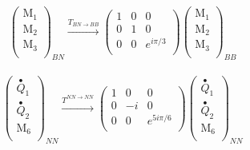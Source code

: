 \documentclass[12pt,a4paper]{article}
\newcounter{arrow}
\begin{document}
\begin{align}
\left( \begin{matrix}
\text{M}_1\\
\text{M}_2\\
\text{M}_3\\
\end{matrix} \right)_{BN} 
\xrightarrow{T_{BN \rightarrow BB}} 
\left(\begin{matrix} 
1 & 0 &0 \\
0 & 1 & 0 \\
0 & 0 & e^{i \pi /3} \\
\end{matrix} \right)
\left( \begin{matrix}
\text{M}_1\\
\text{M}_2\\
\text{M}_3\\
\end{matrix} \right)_{BB}
\end{align}

\begin{align}
\left( \begin{matrix}
\stackrel{\bullet}{Q}_{1}\\
\stackrel{\bullet}{Q}_{2}\\
\text{M}_6 \\ 
\end{matrix} \right)_{NN} \xrightarrow{T^{NN\rightarrow NN}}
\left( \begin{matrix} 
1 & 0&0 \\
0 & -i & 0 \\
0 & 0& e^{5 i \pi /6}\\
\end{matrix} \right) 
\left( \begin{matrix}
\stackrel{\bullet}{Q}_{1}\\
\stackrel{\bullet}{Q}_{2}\\
\text{M}_6 \\ 
\end{matrix} \right)_{NN}
\end{align}
\end{document}
